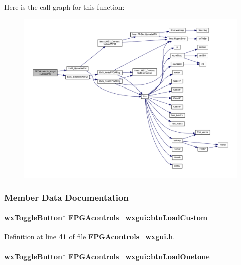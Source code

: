 Here is the call graph for this function\+:
\nopagebreak
\begin{figure}[H]
\begin{center}
\leavevmode
\includegraphics[width=350pt]{d7/db5/classFPGAcontrols__wxgui_a38956cbf989877796b156f8e5cfec9ab_cgraph}
\end{center}
\end{figure}




\subsubsection{Member Data Documentation}
\paragraph[{btn\+Load\+Custom}]{\setlength{\rightskip}{0pt plus 5cm}wx\+Toggle\+Button$\ast$ F\+P\+G\+Acontrols\+\_\+wxgui\+::btn\+Load\+Custom}\label{classFPGAcontrols__wxgui_a71015349af74f3ca71de027887b2796a}


Definition at line {\bf 41} of file {\bf F\+P\+G\+Acontrols\+\_\+wxgui.\+h}.

\paragraph[{btn\+Load\+Onetone}]{\setlength{\rightskip}{0pt plus 5cm}wx\+Toggle\+Button$\ast$ F\+P\+G\+Acontrols\+\_\+wxgui\+::btn\+Load\+Onetone}\label{classFPGAcontrols__wxgui_ac7d73b239da725180bd1e97b2070816c}


